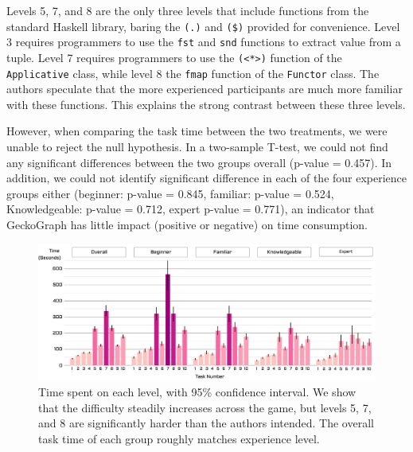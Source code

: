 Levels 5, 7, and 8 are the only three levels that include functions from the standard Haskell library, baring the \texttt{(.)} and \texttt{(\$)} provided for convenience. Level 3 requires programmers to use the \texttt{fst} and \texttt{snd} functions to extract value from a tuple. Level 7 requires programmers to use the \texttt{(<*>)} function of the \texttt{Applicative} class, while level 8 the \texttt{fmap} function of the \texttt{Functor} class. The authors speculate that the more experienced participants are much more familiar with these functions. This explains the strong contrast between these three levels. 


However, when comparing the task time between the two treatments, we were unable to reject the null hypothesis. In a two-sample T-test, we could not find any significant differences between the two groups overall (p-value = 0.457). In addition, we could not identify significant difference in each of the four experience groups either (beginner: p-value = 0.845, familiar: p-value = 0.524, Knowledgeable: p-value = 0.712, expert p-value = 0.771), an indicator that GeckoGraph has little impact (positive or negative) on time consumption.


\begin{figure}[hbt]
  \includegraphics[width=\linewidth]{figures/LevelTime}
  \caption[Time spent on each level, with 95\% confidence interval]{\label{fig:level-time} Time spent on each level, with 95\% confidence interval. We show that the difficulty steadily increases across the game, but levels 5, 7, and 8 are significantly harder than the authors intended. The overall task time of each group roughly matches experience level.}
\end{figure}


